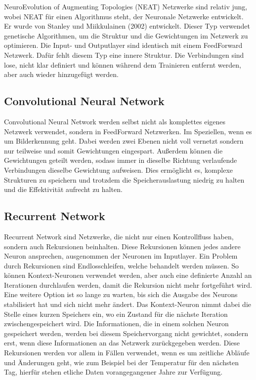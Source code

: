 NeuroEvolution of Augmenting Topologies (NEAT) Netzwerke sind relativ jung, wobei NEAT für einen Algorithmus steht, der Neuronale Netzwerke entwickelt.
Er wurde von Stanley und Miikkulainen (2002) entwickelt. 
Dieser Typ verwendet genetische Algorithmen, um die Struktur und die Gewichtungen im Netzwerk zu optimieren.
Die Input- und Outputlayer sind identisch mit einem FeedForward Netzwerk.
Dafür fehlt diesem Typ eine innere Struktur. 
Die Verbindungen sind lose, nicht klar definiert und können während dem Trainieren entfernt werden, aber auch wieder hinzugefügt werden.

\subsection{Convolutional Neural Network}

Convolutional Neural Network werden selbst nicht als komplettes eigenes Netzwerk verwendet, sondern in FeedForward Netzwerken.
Im Speziellen, wenn es um Bilderkennung geht.
Dabei werden zwei Ebenen nicht voll vernetzt sondern nur teilweise und somit Gewichtungen eingespart.
Außerdem können die Gewichtungen geteilt werden, sodass immer in dieselbe Richtung verlaufende Verbindungen dieselbe Gewichtung aufweisen.
Dies ermöglicht es, komplexe Strukturen zu speichern und trotzdem die Speicherauslastung niedrig zu halten und die Effektivität aufrecht zu halten.

\subsection{Recurrent Network}

Recurrent Network sind Netzwerke, die nicht nur einen Kontrollfluss haben, sondern auch Rekursionen beinhalten. 
Diese Rekursionen können jedes andere Neuron ansprechen, ausgenommen der Neuronen im Inputlayer.
Ein Problem durch Rekursionen sind Endlosschleifen, welche behandelt werden müssen.
So können Kontext-Neuronen verwendet werden, aber auch eine definierte Anzahl an Iterationen durchlaufen werden, damit die Rekursion nicht mehr fortgeführt wird. 
Eine weitere Option ist so lange zu warten, bis sich die Ausgabe des Neurons stabilisiert hat und sich nicht mehr ändert.
Das Kontext-Neuron nimmt dabei die Stelle eines kurzen Speichers ein, wo ein Zustand für die nächste Iteration zwischengespeichert wird.
Die Informationen, die in einem solchen Neuron gespeichert werden, werden bei diesem Speichervorgang nicht gewichtet, sondern erst, wenn diese Informationen an das Netzwerk zurückgegeben werden.
Diese Rekursionen werden vor allem in Fällen verwendet, wenn es um zeitliche Abläufe und Änderungen geht, wie zum Beispiel bei der Temperatur für den nächsten Tag, hierfür stehen etliche Daten vorangegangener Jahre zur Verfügung.

